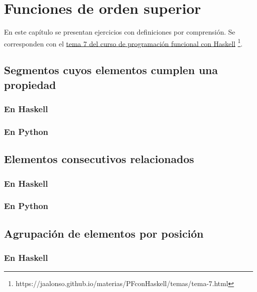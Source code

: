 \documentclass[a4paper,12pt,twoside]{book}
\begin{document}
\chapter{Funciones de orden superior}

En este capítulo se presentan ejercicios con definiciones por
comprensión. Se corresponden con el
\href{https://jaalonso.github.io/materias/PFconHaskell/temas/tema-7.html}
{tema 7 del curso de programación funcional con Haskell}
\footnote{https://jaalonso.github.io/materias/PFconHaskell/temas/tema-7.html}.

\minitoc

\section{Segmentos cuyos elementos cumplen una propiedad}
\subsection*{En Haskell}
\subsection*{En Python}

\section{Elementos consecutivos relacionados}
\subsection*{En Haskell}
\subsection*{En Python}

\section{Agrupación de elementos por posición}
\subsection*{En Haskell}
\end{document}
